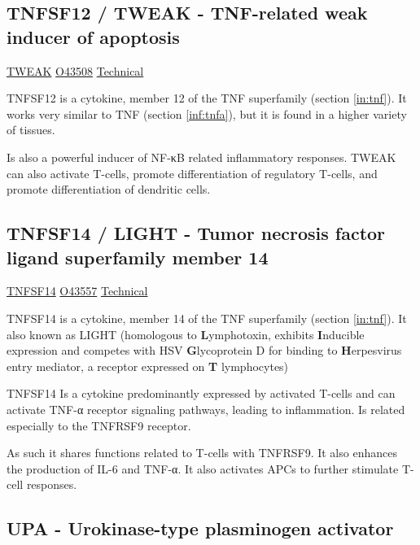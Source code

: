 \subsection{TNFSF12 / TWEAK - TNF-related weak inducer of apoptosis}

\href{https://en.wikipedia.org/wiki/Tumor \textunderscore necrosis \textunderscore factor}{TWEAK}
\href{http://www.uniprot.org/uniprot/O43508}{O43508}
\href{https://olink.com/products-services/target/protein/?assayID=5117}{Technical}

TNFSF12 is a cytokine, member 12 of the TNF superfamily (section \ref{in:tnf}). It works very similar to TNF (section \ref{inf:tnfa}), but it is found in a higher variety of tissues. 

Is also a powerful inducer of NF-κB related inflammatory responses. TWEAK can also activate T-cells, promote differentiation of regulatory T-cells, and promote differentiation of dendritic cells.

\subsection{TNFSF14 / LIGHT - Tumor necrosis factor ligand superfamily member 14}

\href{https://en.wikipedia.org/wiki/LIGHT \textunderscore (protein)}{TNFSF14}
\href{http://www.uniprot.org/uniprot/O43557}{O43557}
\href{https://olink.com/products-services/target/protein/?assayID=5045}{Technical}

TNFSF14 is a cytokine, member 14 of the TNF superfamily (section \ref{in:tnf}). It also known as LIGHT (homologous to \textbf{L}ymphotoxin, exhibits \textbf{I}nducible expression and competes with HSV \textbf{G}lycoprotein D for binding to \textbf{H}erpesvirus entry mediator, a receptor expressed on \textbf{T} lymphocytes) %

TNFSF14 Is a cytokine predominantly expressed by activated T-cells and can activate TNF-α receptor signaling pathways, leading to inflammation. Is related especially to the TNFRSF9 receptor.

As such it shares functions related to T-cells with TNFRSF9. It also enhances the production of IL-6 and TNF-α. It also activates APCs to further stimulate T-cell responses.

\subsection{UPA - Urokinase-type plasminogen activator}

